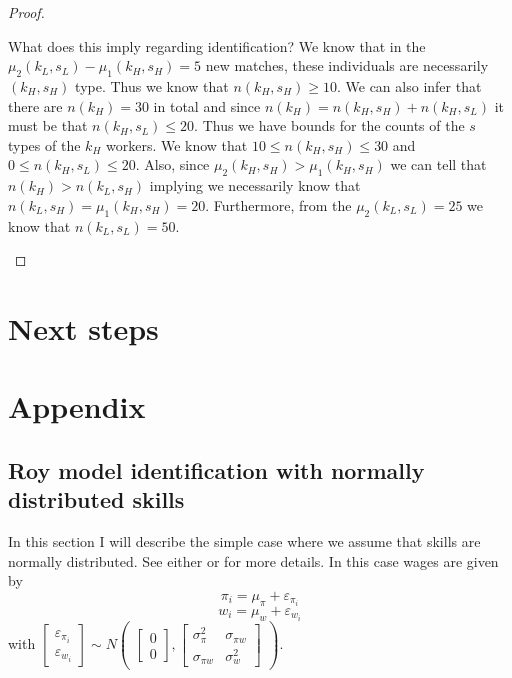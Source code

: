 \documentclass[12 pt]{article}
\begin{document}
\begin{proof}
\begin{enumerate}
		 What does this imply regarding identification? We know that in the $\mu_2(k_L,s_L)-\mu_1(k_H,s_H)=5$ new matches, these individuals are necessarily $(k_H,s_H)$ type. Thus we know that $n(k_H,s_H) \geq 10$. We can also infer that there are $n(k_H)=30$ in total and since $n(k_H) = n(k_H,s_H) + n(k_H,s_L)$ it must be that $n(k_H,s_L)\leq 20$. Thus we have bounds for the counts of the $s$ types of the $k_H$ workers. We know that $10 \leq n(k_H,s_H) \leq 30$ and $0 \leq n(k_H,s_L)\leq 20$. Also, since $\mu_2(k_H,s_H)>\mu_1(k_H,s_H)$ we can tell that $n(k_H) > n(k_L,s_H)$ implying we necessarily know that $n(k_L,s_H) = \mu_1(k_H,s_H) = 20$.  Furthermore, from the $\mu_2(k_L,s_L)=25$ we know that $n(k_L,s_L)=50$.  
	\end{enumerate}
\end{proof}

\section{Next steps}


\newpage



\newpage
\setcounter{section}{0}
\renewcommand{\thesection}{\Alph{section}}
\renewcommand\theequation{\thesection\arabic{equation}}
\section{Appendix}
\subsection{Roy model identification with normally distributed skills}

In this section I will describe the simple case where we assume that skills are normally distributed. See either \citet{heckman1990empirical} or \citet{french2011identification} for more details. In this case wages are given by
\begin{equation}
	\pi_i = \mu_\pi + \varepsilon_{\pi_i}
	\label{eqn:pi_simple_app}
\end{equation}
\begin{equation}
	w_i = \mu_w + \varepsilon_{w_i}
	\label{eqn:w_simple_app}
\end{equation}
with $\begin{bmatrix}
	\varepsilon_{\pi_i}\\
	\varepsilon_{w_i}
\end{bmatrix} \sim N \begin{pmatrix}
	\begin{bmatrix}
		0\\
		0
	\end{bmatrix},
	\begin{bmatrix}
		\sigma_\pi^2 & \sigma_{\pi w}\\
		\sigma_{\pi w} & \sigma_w^2 
	\end{bmatrix}
\end{pmatrix}$.
\end{document}
